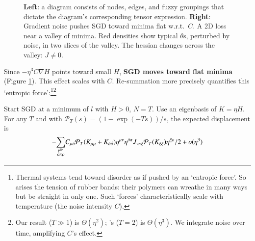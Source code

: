 \begin{figure}%
    \centering
    \caption{%
        \textbf{Left}:
        a diagram consists of nodes,
                  edges, and fuzzy groupings that dictate the diagram's
                  corresponding tensor expression.
        \textbf{Right}:         %
        Gradient noise pushes SGD toward minima flat w.r.t.\ $C$.
            A 2D loss near
            a valley of minima.  Red densities show typical
            $\theta$s, perturbed by noise,
            in two slices of the valley.  The hessian
            changes across the valley: $J \neq 0$.  
    }
    \label{fig:cubic}
\end{figure}
Since $-\eta^3 C\nabla H$ points toward small $H$, \textbf{SGD moves
toward flat minima} (Figure \ref{fig:cubic}).
This effect scales with $C$.  
%
%
Re-summation more precisely quantifies this `entropic force':\footnote{
    Thermal systems tend toward disorder as if pushed by an
    `entropic force'.
    So arises the tension of rubber
    bands: their polymers can wreathe in
    many ways but be straight in only one.
    Such `forces' characteristically 
    scale with
    temperature (the noise intensity $C$).
}\footnote{
    Our result ($T\gg 1$) is $\Theta(\eta^2)$; \cite{ya19b}'s
    ($T=2$) is $\Theta(\eta^3)$.  We
    integrate noise over time, amplifying $C$'s
    effect. 
}
%
\begin{cor}\label{cor:entropic}%
    Start SGD at a minimum of $l$ with $H>0$, $N=T$.  Use
    an eigenbasis of $K=\eta H$.  
    For any $T$ and
    with ${\mathcal P}_T(s) = (1 - \exp(-Ts))/s$,
    the 
    expected displacement is
    $$
        -
        {\sum_{\substack{\mu\nu    \\ {\acute{o}}\pi\rho}}}
            C_{\mu{\acute{o}}}
            {{\mathcal P}_T(K_{\mu\mu} + K_{{\acute{o}}{\acute{o}}})}
            \eta^{\mu\nu}\eta^{{\acute{o}}\pi}
            J_{\nu\pi\xi}
            {{\mathcal P}_T(K_{\xi\xi})}\eta^{\xi\rho}/2
        + o(\eta^3)
    $$
\end{cor}


